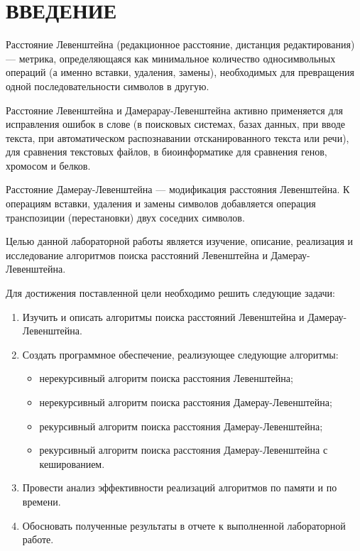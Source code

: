\chapter*{ВВЕДЕНИЕ}

Расстояние Левенштейна (редакционное расстояние, дистанция редактирования) — метрика, определяющаяся как минимальное количество односимвольных операций (а именно вставки, удаления, замены), необходимых для превращения одной последовательности символов в другую.

Расстояние Левенштейна и Дамерарау-Левенштейна активно применяется для исправления ошибок в слове (в поисковых системах, базах данных, при вводе текста, при автоматическом распознавании отсканированного текста или речи), для сравнения текстовых файлов, в биоинформатике для сравнения генов, хромосом и белков.

Расстояние Дамерау-Левенштейна — модификация расстояния Левенштейна. К операциям вставки, удаления и замены символов добавляется операция транспозиции (перестановки) двух соседних символов.

Целью данной лабораторной работы является изучение, описание, реализация и исследование алгоритмов поиска расстояний Левенштейна и Дамерау-Левенштейна.

Для достижения поставленной цели необходимо решить следующие задачи: 

\begin{enumerate}[label={\arabic*)}]
	\item Изучить и описать алгоритмы поиска расстояний Левенштейна и Дамерау-Левенштейна.
	\item Создать программное обеспечение, реализующее следующие алгоритмы:
	\begin{itemize}[label=--]
		\item нерекурсивный алгоритм поиска расстояния Левенштейна;
		\item нерекурсивный алгоритм поиска расстояния Дамерау-Левенштейна;
		\item рекурсивный алгоритм поиска расстояния Дамерау-Левенштейна;
		\item рекурсивный алгоритм поиска расстояния Дамерау-Левенштейна с кешированием.
	\end{itemize}
\clearpage
	\item Провести анализ эффективности реализаций алгоритмов по памяти и по времени.
	\item Обосновать полученные результаты в отчете к выполненной лабораторной работе.
\end{enumerate}
